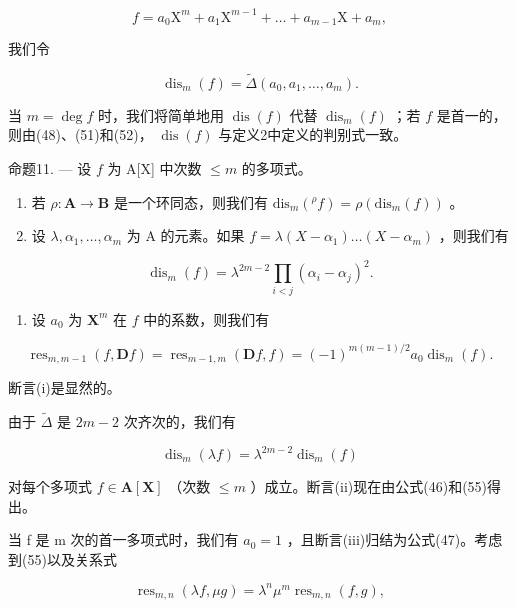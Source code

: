 \[
f = a _ {0} \mathrm{X} ^ {m} + a _ {1} \mathrm{X} ^ {m - 1} + \dots + a _ {m - 1} \mathrm{X} + a _ {m},
\]

我们令

\[
\operatorname{dis} _ {m} (f) = \tilde {\Delta} \left(a _ {0}, a _ {1}, \dots , a _ {m}\right).\tag{52}
\]

当 \(m = \deg f\) 时，我们将简单地用 \(\operatorname{dis}(f)\) 代替 \(\operatorname{dis}_m(f)\) ；若 \(f\) 是首一的，则由(48)、(51)和(52)， \(\operatorname{dis}(f)\) 与定义2中定义的判别式一致。

命题11. --- 设 \(f\) 为 A{[}X{]} 中次数 \(\leqslant m\) 的多项式。

\begin{enumerate}
\def\labelenumi{(\roman{enumi})}
\item
  若 \(\rho: \mathbf{A} \to \mathbf{B}\) 是一个环同态，则我们有 \(\mathrm{dis}_m({}^{\rho}f) = \rho(\mathrm{dis}_m(f))\) 。
\item
  设 \(\lambda, \alpha_{1}, \ldots, \alpha_{m}\) 为 A 的元素。如果 \(f = \lambda(X - \alpha_{1}) \ldots (X - \alpha_{m})\) ，则我们有
\end{enumerate}

\[
\operatorname{dis} _ {m} (f) = \lambda^ {2 m - 2} \prod_ {i <   j} (\alpha_ {i} - \alpha_ {j}) ^ {2}.\tag{53}
\]

\begin{enumerate}
\def\labelenumi{(\roman{enumi})}
\setcounter{enumi}{2}
\tightlist
\item
  设 \(a_0\) 为 \(\mathbf{X}^m\) 在 \(f\) 中的系数，则我们有
\end{enumerate}

\[
\operatorname{res} _ {m, m - 1} (f, \mathbf {D} f) = \operatorname{res} _ {m - 1, m} (\mathbf {D} f, f) = (- 1) ^ {m (m - 1) / 2} a _ {0} \operatorname{dis} _ {m} (f).\tag{54}
\]

断言(i)是显然的。

由于 \(\tilde{\Delta}\) 是 \(2m - 2\) 次齐次的，我们有

\[
\operatorname{dis} _ {m} (\lambda f) = \lambda^ {2 m - 2} \operatorname{dis} _ {m} (f)\tag{55}
\]

对每个多项式 \(f \in \mathbf{A}[\mathbf{X}]\) （次数 \(\leqslant m\) ）成立。断言(ii)现在由公式(46)和(55)得出。

当 f 是 m 次的首一多项式时，我们有 \(a_{0} = 1\) ，且断言(iii)归结为公式(47)。考虑到(55)以及关系式

\[
\operatorname{res} _ {m, n} (\lambda f, \mu g) = \lambda^ {n} \mu^ {m} \operatorname{res} _ {m, n} (f, g),\tag{56}
\]

